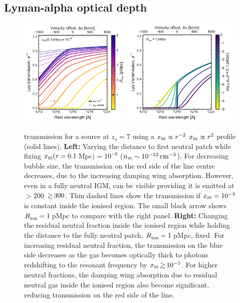 \documentclass[fleqn,usenatbib]{mnras}
\providecommand{\DIFadd}[1]{{\protect\color{Green} {\bf #1}}} %
\providecommand{\DIFdel}[1]{{\protect\color{Gray} \scriptsize \sout{#1}}} %
\providecommand{\DIFaddend}{} %
\providecommand{\DIFaddFL}[1]{\DIFadd{#1}} %
\providecommand{\DIFdelFL}[1]{\DIFdel{#1}} %
\providecommand{\DIFaddbeginFL}{} %
\providecommand{\DIFaddendFL}{} %
\providecommand{\DIFdelbeginFL}{} %
\providecommand{\DIFdelendFL}{} %
\newcommand{\DIFscaledelfig}{0.5}
\newlength{\DIFdelgraphicswidth} %
\newlength{\DIFdelgraphicsheight} %
\newcommand{\DIFaddincludegraphics}[2][]{{\color{purple}\fbox{\DIFOincludegraphics[#1]{#2}}}} %
\newcommand{\DIFdelincludegraphics}[2][]{%
\sbox{\DIFdelgraphicsbox}{\DIFOincludegraphics[#1]{#2}}%
\settoboxwidth{\DIFdelgraphicswidth}{\DIFdelgraphicsbox} %
\settoboxtotalheight{\DIFdelgraphicsheight}{\DIFdelgraphicsbox} %
\scalebox{\DIFscaledelfig}{%
\parbox[b]{\DIFdelgraphicswidth}{\usebox{\DIFdelgraphicsbox}\\[-\baselineskip] \rule{\DIFdelgraphicswidth}{0em}}\llap{\resizebox{\DIFdelgraphicswidth}{\DIFdelgraphicsheight}{%
\setlength{\unitlength}{\DIFdelgraphicswidth}%
\begin{picture}(1,1)%
\thicklines\linethickness{2pt} %
{\color[rgb]{1,0,0}\put(0,0){\framebox(1,1){}}}%
{\color[rgb]{1,0,0}\put(0,0){\line( 1,1){1}}}%
{\color[rgb]{1,0,0}\put(0,1){\line(1,-1){1}}}%
\end{picture}%
}\hspace*{3pt}}} %
} %
\DeclareRobustCommand{\DIFaddend}{\DIFOaddend \let\includegraphics\DIFOincludegraphics} %
\DeclareRobustCommand{\DIFaddbeginFL}{\DIFOaddbeginFL \let\includegraphics\DIFaddincludegraphics} %
\DeclareRobustCommand{\DIFaddendFL}{\DIFOaddendFL \let\includegraphics\DIFOincludegraphics} %
\DeclareRobustCommand{\DIFdelbeginFL}{\DIFOdelbeginFL \let\includegraphics\DIFdelincludegraphics} %
\DeclareRobustCommand{\DIFdelendFL}{\DIFOaddendFL \let\includegraphics\DIFOincludegraphics} %
\begin{document}
\DIFaddend %
\subsection{Lyman-alpha optical depth}
\label{sec:model_optdepth}

\begin{figure}
    \includegraphics[width=0.48\textwidth]{figs/fig1a.pdf}
    \includegraphics[width=0.49\textwidth]{figs/fig1b.pdf}
    \caption{\lya transmission for a source at $z_s=7$ using a \DIFdelbeginFL \DIFdelFL{$\xHI \propto r^{-2}$ }\DIFdelendFL \DIFaddbeginFL \DIFaddFL{$\xHI \propto r^{2}$ }\DIFaddendFL profile (solid lines). \textbf{Left:} Varying the distance to first neutral patch while fixing $\xHI(r=0.1\,$Mpc$) = 10^{-8}$ ($n_\HI \sim 10^{-12}\cm^{-3}$). For decreasing bubble size, the transmission on the red side of the \lya line centre decreases, due to the increasing damping wing absorption. However, even in a fully neutral IGM, \lya can be visible providing it is emitted at \DIFdelbeginFL \DIFdelFL{$>200$}\DIFdelendFL \DIFaddbeginFL \DIFaddFL{$\simgt300$}\DIFaddendFL \kms. Thin dashed lines show the transmission if $\xHI=10^{-8}$ is constant inside the ionised region. The small black arrow shows $\Rion=1\,$pMpc to compare with the right panel. \textbf{Right:} Changing the residual neutral fraction inside the ionised region while holding the distance to the fully neutral patch, $\Rion=1\,$pMpc, fixed. For increasing residual neutral fraction, the transmission on the blue side decreases as the gas becomes optically thick to \lya photons redshifting to the resonant frequency by $\xHI \simgt 10^{-5}$. For higher neutral fractions, the damping wing absorption due to residual neutral gas inside the ionised region also become significant, reducing transmission on the red side of the line.}
    \label{fig:lya_transmission}
\end{figure}
\end{document}
